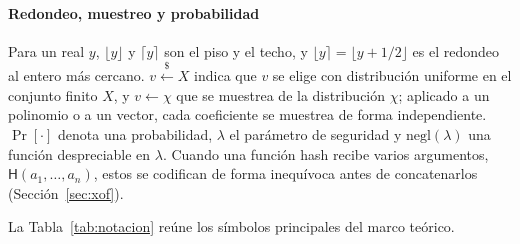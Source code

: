 \paragraph{Redondeo, muestreo y probabilidad}
Para un real $y$, $\lfloor y \rfloor$ y $\lceil y \rceil$ son el piso y el techo, y $\lfloor y \rceil = \lfloor y + 1/2 \rfloor$ es el redondeo al entero más cercano. $v \xleftarrow{\$} X$ indica que $v$ se elige con distribución uniforme en el conjunto finito $X$, y $v \leftarrow \chi$ que se muestrea de la distribución $\chi$; aplicado a un polinomio o a un vector, cada coeficiente se muestrea de forma independiente. $\Pr[\cdot]$ denota una probabilidad, $\lambda$ el parámetro de seguridad y $\mathrm{negl}(\lambda)$ una función despreciable en $\lambda$. Cuando una función hash recibe varios argumentos, $\mathsf{H}(a_1, \dots, a_n)$, estos se codifican de forma inequívoca antes de concatenarlos (Sección~\ref{sec:xof}).

La Tabla~\ref{tab:notacion} reúne los símbolos principales del marco teórico.


